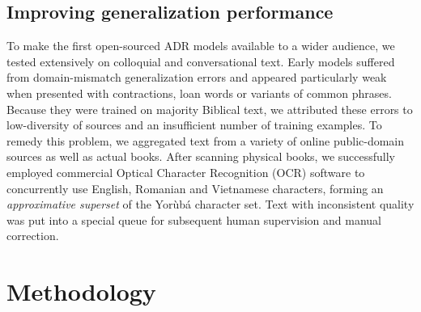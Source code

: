 \documentclass{article} %
\begin{document}

\subsection{Improving generalization performance}

To make the first open-sourced ADR models available to a wider audience, we tested extensively on colloquial and conversational text. Early models suffered from domain-mismatch generalization errors and appeared particularly weak when presented with contractions, loan words or variants of common phrases. Because they were trained on majority Biblical text, we attributed these errors to low-diversity of sources and an insufficient number of training examples. To remedy this problem, we aggregated text from a variety of online public-domain sources as well as actual books. After scanning physical books, we successfully employed commercial Optical Character Recognition (OCR) software to concurrently use English, Romanian and Vietnamese characters, forming an \emph{approximative superset} of the Yor{\`u}b{\'a} character set. Text with inconsistent quality was put into a special queue for subsequent human supervision and manual correction. 

\section{Methodology}\label{sec:methods}


\end{document}
